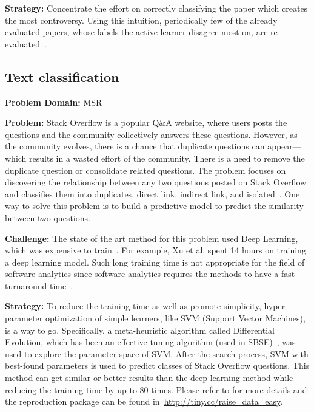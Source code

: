\documentclass[sigconf]{acmart}
\begin{document}
\noindent\textbf{Strategy: }
Concentrate the effort on correctly classifying the paper which creates the most controversy. Using this intuition, periodically few of the already evaluated papers, whose labels the active learner disagree most on, are re-evaluated~\cite{YuM17}.



    \subsection{Text classification}
\noindent\textbf{Problem Domain: } MSR

\noindent\textbf{Problem: } Stack Overflow is a popular Q\&A website, where users posts the questions and the community collectively answers these questions. However, as the community evolves, there is a chance that duplicate questions can appear---which results in a wasted effort of the community. There is a need to remove the duplicate question or consolidate related questions. The problem focuses on discovering the relationship between any two questions posted on Stack Overflow and classifies them into duplicates, direct link, indirect link, and isolated~\cite{fu2017easy, xu2016predicting}. One way to solve this problem is to build a predictive model to predict the similarity between two questions. 

\noindent\textbf{Challenge: } The state of the art method for this problem used Deep Learning, which was expensive to train~\cite{xu2016predicting}. For example, Xu et al. spent 14 hours on training a deep learning model. Such long training time is not appropriate for the field of software analytics since software analytics requires the methods to have a fast turnaround time~\cite{zhang2013software}.

\noindent\textbf{Strategy: }To reduce the training time as well as promote simplicity, hyper-parameter optimization of simple learners, like SVM (Support Vector Machines), is a way to go. Specifically, a {meta-heuristic algorithm called} Differential Evolution, which has been an effective tuning algorithm (used in SBSE)~\cite{fu2016tuning},
was used to explore the parameter space of SVM. After the search process,
 SVM with best-found parameters is used to predict classes of Stack Overflow questions. This method can get similar or better results
than the deep learning method while reducing the training time by up to 80 times. Please refer to \cite{fu2017easy} for more details and the reproduction package can be found in~\url{http://tiny.cc/raise_data_easy}.
\end{document}
